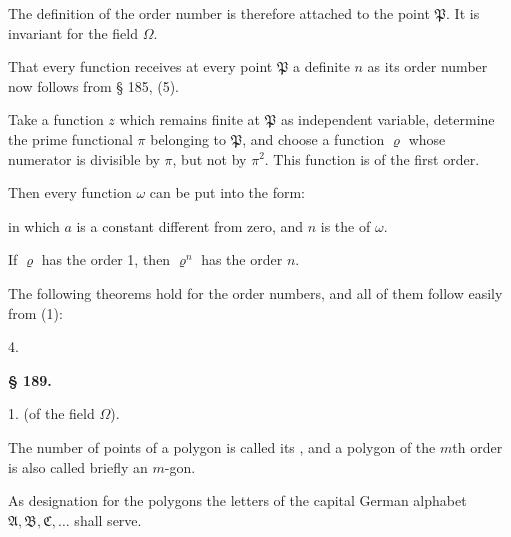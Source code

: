 The definition of the order number is therefore attached to the point $\mathfrak{P}$. It is invariant for the field $\Omega$.

That every function receives at every point $\mathfrak{P}$ a definite  $n$ as its order number now follows from § 185, (5).

Take a function $z$ which remains finite at $\mathfrak{P}$ as independent variable, determine the prime functional $\pi$ belonging to $\mathfrak{P}$, and choose a function $\varrho$ whose numerator is divisible by $\pi$, but not by $\pi^2$. This function is of the first order.

Then every function $\omega$ can be put into the form:

in which $a$ is a constant different from zero, and $n$ is the  of $\omega$.

If $\varrho$ has the order 1, then $\varrho^n$ has the order $n$.

The following theorems hold for the order numbers, and all of them follow easily from (1):

4. 



\begin{center}
\textbf{§ 189. }
\end{center}

1.  (of the field $\Omega$).

The number of points of a polygon is called its , and a polygon of the $m$th order is also called briefly an $m$-gon.

As designation for the polygons the letters of the capital German alphabet $\mathfrak{A}, \mathfrak{B}, \mathfrak{C}, \ldots$ shall serve.
